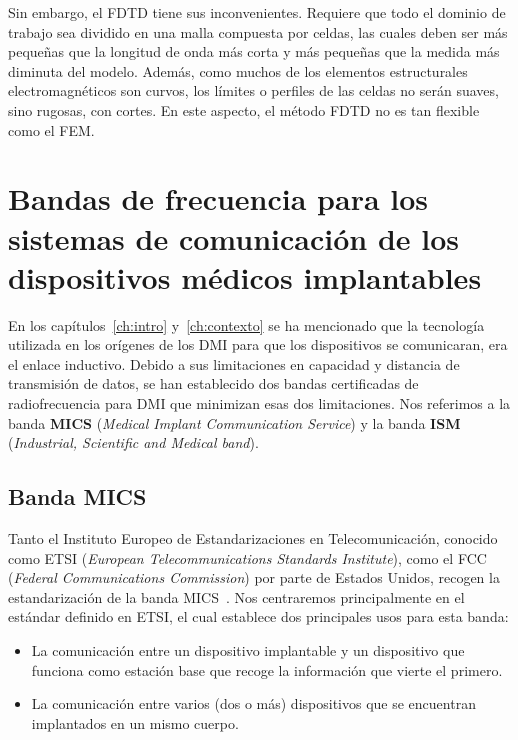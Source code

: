 Sin embargo, el FDTD tiene sus inconvenientes. Requiere que todo el dominio de trabajo sea dividido en una malla compuesta por celdas, las cuales deben ser más pequeñas que la longitud de onda más corta y más pequeñas que la medida más diminuta del modelo. Además, como muchos de los elementos estructurales electromagnéticos son curvos, los límites o perfiles de las celdas no serán suaves, sino rugosas, con cortes. En este aspecto, el método FDTD no es tan flexible como el FEM.


\section{Bandas de frecuencia para los sistemas de comunicación de los dispositivos médicos implantables}\label{bandas}

En los capítulos~\ref{ch:intro} y~\ref{ch:contexto} se ha mencionado que la tecnología utilizada en los orígenes de los DMI para que los dispositivos se comunicaran, era el enlace inductivo. Debido a sus limitaciones en capacidad y distancia de transmisión de datos, se han establecido dos bandas certificadas de radiofrecuencia para DMI que minimizan esas dos limitaciones. Nos referimos a la banda \textbf{MICS} (\textit{Medical Implant Communication Service}) y la banda \textbf{ISM} (\textit{Industrial, Scientific and Medical band}).

\subsection{Banda MICS}

Tanto el Instituto Europeo de Estandarizaciones en Telecomunicación, conocido como ETSI (\textit{European Telecommunications Standards Institute}), como el FCC (\textit{Federal Communications Commission}) por parte de Estados Unidos, recogen la estandarización de la banda MICS~\cite{mics}. Nos centraremos principalmente en el estándar definido en ETSI, el cual establece dos principales usos para esta banda:

\begin{itemize}
    \item La comunicación entre un dispositivo implantable y un dispositivo que funciona como estación base que recoge la información que vierte el primero.
    \item La comunicación entre varios (dos o más) dispositivos que se encuentran implantados en un mismo cuerpo.
\end{itemize}

